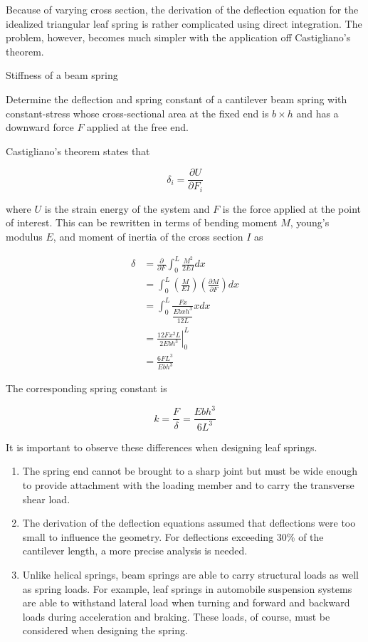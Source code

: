 \documentclass[a4paper,openany,12pt]{book}
\begin{document}
{{Because of varying cross section, the derivation of the deflection
equation for the idealized triangular leaf spring is rather complicated
using direct integration. The problem, however, becomes much simpler
with the application off Castigliano's theorem.

Stiffness of a beam spring

Determine the deflection and spring constant of a cantilever beam spring
with constant-stress whose cross-sectional area at the fixed end is
\(b \times h\) and has a downward force \(F\) applied at the free end.


Castigliano's theorem states that

$$\delta_i = \frac{\partial U}{\partial F_i}$$

where \(U\) is the strain energy of the system and \(F\) is the force
applied at the point of interest. This can be rewritten in terms of
bending moment \(M\), young's modulus \(E\), and moment of inertia of the
cross section \(I\) as

$$\begin{aligned}
    \delta  &= \frac{\partial }{\partial F} \int_0^L \frac{M^2}{2EI}dx \\ 
            &= \int_0^L \left( \frac{M}{EI} \right)\left( \frac{\partial M}{\partial F} \right)dx \\ 
            &= \int_0^L \frac{Fx}{\dfrac{Ebxh^3}{12L}}xdx \\ 
            &= \left. \frac{12Fx^2L}{2Ebh^3} \right|_0^L \\ 
            &= \frac{6FL^3}{Ebh^3}
  \end{aligned}$$

The corresponding spring constant is

$$k = \frac{F}{\delta } = \frac{Ebh^3}{6L^3}$$

It is important to observe these differences when designing leaf
springs.

\begin{enumerate}
\item The spring end cannot be brought to a sharp joint but must be wide
enough to provide attachment with the loading member and to carry the
transverse shear load.

\item The derivation of the deflection equations assumed that deflections
were too small to influence the geometry. For deflections exceeding
30\% of the cantilever length, a more precise analysis is needed.

\item Unlike helical springs, beam springs are able to carry structural
loads as well as spring loads. For example, leaf springs in
automobile suspension systems are able to withstand lateral load when
turning and forward and backward loads during acceleration and
braking. These loads, of course, must be considered when designing
the spring.
\end{enumerate}

}}
\end{document}

